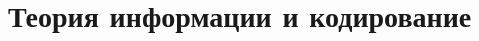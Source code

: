 \section{Теория информации и кодирование}
\begin{comment}
\subsection{Основные определения}
Пусть $X$ - дискретная случайная величина, принимающая значения из конечного множества (алфавита) $A = \{a_1,..., a_{|A|}\}$. $P = \{\mathbb{P}\{X = a_i\} = p_{a_i}\}$ - вероятностное распределение $X$ на $A$.

\begin{definition} \textit{Словом} в алфавите $A$ будем называть реализацию последовательности случайных величин $X_1,...,X_n..$: $w = (x_1...x_n..)$, $x_i \in A$.
\end{definition}

\begin{definition} 
\textit{Энтропией} $H(X)$ случайной величины $X$ распределенной по закону $P$ называется:
\begin{center}
$H(X) = - \sum_{a \in A} p_a\log p_a$, где $\log = \log_2$.
\end{center}
Иногда вместо $H(X)$  используется запись $H(P)$.
Энтропия измеряется в битах и интерпретируется как мера неопределенности или информационного содержания случайной величины. Чем она больше, тем больше неопределенность. В качестве иллюстрации, читателю предлагается решить первую задачу.
\end{definition}
В случае нескольких случайных величин можно определить два тесно связанных понятия: \textit{условной энтропии} и \textit{совместной информации}.
\begin{definition}
\textit{Условной энтропией} двух с.в. $X$ и $Y$ называется $H(X|Y) = \sum_{a \in A} \mathbb{P}(Y = a)H(X|Y=a)$, где $H(X|Y=a) = \sum_{a' \in A} \frac{\mathbb{P}(X = a', Y = a)}{\mathbb{P}(Y = a)} \log \frac{\mathbb{P}(X = a', Y = a)}{\mathbb{P}(Y = a)}$. Условная энтропия характеризует ту среднюю степень неопределнности, содержащейся в $X$, если имеется некоторая информация об $Y$.
\end{definition}

\begin{definition}
\textit{Совместная информация} $I(X,Y) = H(X) - H(X|Y)$ определяет то, сколько информации об $X$ содержится в $Y$.
\end{definition}


\end{comment}
